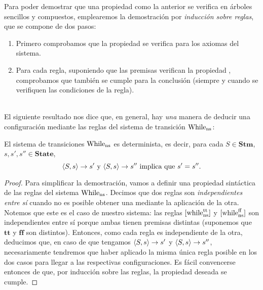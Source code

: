 Para poder demostrar que una propiedad como la anterior se verifica en árboles sencillos y compuestos, emplearemos la demostración por \textit{inducción sobre reglas}, que se compone de dos pasos:
\begin{enumerate}
    \item Primero comprobamos que la propiedad se verifica para los axiomas del sistema.
    \item Para cada regla, suponiendo que las premisas verifican la propiedad , comprobamos que también se cumple para la conclusión (siempre y cuando se verifiquen las condiciones de la regla).
\end{enumerate}
\\

El siguiente resultado nos dice que, en general, hay \textit{una} manera de deducir una configuración mediante las reglas del sistema de transición $\mathrm{While}_{\mathrm{ns}}$:

\begin{theorem}\label{determinismo}
El sistema de transiciones $\mathrm{While}_{\mathrm{ns}}$ es determinista, es decir, para cada $S \in \mathbf{Stm}$, $s, s', s'' \in \mathbf{State}$,  
$$\langle S, s \rangle\rightarrow s' \text{ y } \langle S, s \rangle\rightarrow s'' \text{ implica que } s'= s''.$$
\end{theorem}
\begin{proof}
Para simplificar la demostración, vamos a definir una propiedad sintáctica de las reglas del sistema $\mathrm{While}_{\mathrm{ns}}$. Decimos que dos reglas son \textit{independientes entre sí} cuando no es posible obtener una mediante la aplicación de la otra. Notemos que este es el caso de nuestro sistema: las reglas $[\mathrm{while}_{\mathrm{ns}}^{\mathrm{tt}}]$ y $[\mathrm{while}_{\mathrm{ns}}^{\mathrm{ff}}]$ son independientes entre sí porque ambas tienen premisas distintas (suponemos que $\mathbf{tt}$ y $\mathbf{ff}$ son distintos). Entonces, como cada regla es independiente de la otra, deducimos que, en caso de que tengamos $\langle S, s \rangle\rightarrow s'$ y $\langle S, s \rangle\rightarrow s''$, necesariamente tendremos que haber aplicado la misma única regla posible en los dos casos para llegar a las respectivas configuraciones. Es fácil convencerse entonces de que, por inducción sobre las reglas, la propiedad deseada se cumple.
\end{proof}
\\


